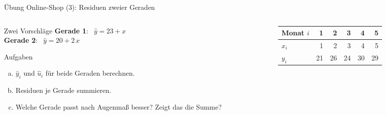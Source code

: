 \documentclass[aspectratio=169,11pt]{beamer}
\newcommand{\uebpunkte}{\addplot[only marks, mark=*, mark size=2.6pt, color=hsbiblue]
  coordinates {(1,21) (2,26) (3,24) (4,30) (5,29)};}
\begin{document}
\begin{frame}{Übung Online-Shop (3): Residuen zweier Geraden}
  \begin{columns}[T]
    \begin{column}{0.45\textwidth}
      \begin{block}{Zwei Vorschläge}
        {\color{hsbiaccent}\textbf{Gerade 1}}: \ $\hat{y} = 23 + x$\\
        {\color{hsbiviolet}\textbf{Gerade 2}}: \ $\hat{y} = 20 + 2\,x$
      \end{block}
      \begin{exampleblock}{Aufgaben}
        \begin{enumerate}[a)]
          \item $\hat{y}_i$ und $\hat{u}_i$ für beide Geraden berechnen.
          \item Residuen je Gerade summieren.
          \item Welche Gerade passt nach Augenmaß besser?
                Zeigt das die Summe?
        \end{enumerate}
      \end{exampleblock}
    \end{column}
    \begin{column}{0.53\textwidth}
      \begin{center}
        \small\renewcommand{\arraystretch}{1.05}
        \begin{tabular}{l*{5}{r}}
          \toprule
          Monat $i$ & 1  & 2  & 3  & 4  & 5  \\
          \midrule
          $x_i$     & 1  & 2  & 3  & 4  & 5  \\
          $y_i$     & 21 & 26 & 24 & 30 & 29 \\
          \bottomrule
        \end{tabular}
      \end{center}
    \end{column}
  \end{columns}
\end{frame}
\end{document}
